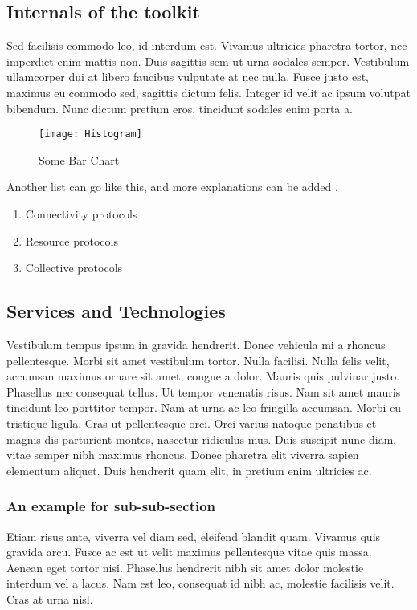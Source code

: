\documentclass[11pt, fullpage]{article}
\begin{document}
\subsection{Internals of the toolkit}

Sed facilisis commodo leo, id interdum est. Vivamus ultricies pharetra tortor, nec imperdiet enim mattis non. Duis sagittis sem ut urna sodales semper. Vestibulum ullamcorper dui at libero faucibus vulputate at nec nulla. Fusce justo est, maximus eu commodo sed, sagittis dictum felis. Integer id velit ac ipsum volutpat bibendum. Nunc dictum pretium eros, tincidunt sodales enim porta a.

\begin{figure}[ht]
\begin{center}
\texttt{[image: Histogram]}
\caption{Some Bar Chart}
\end{center}
\end{figure}

Another list can go like this, and more explanations can be added \cite{apples2}.
\begin{enumerate}
\item
Connectivity protocols 
\item
Resource protocols 
\item
Collective protocols 
\end{enumerate}
	
\subsection{Services and Technologies}
Vestibulum tempus ipsum in gravida hendrerit. Donec vehicula mi a rhoncus pellentesque. Morbi sit amet vestibulum tortor. Nulla facilisi. Nulla felis velit, accumsan maximus ornare sit amet, congue a dolor. Mauris quis pulvinar justo. Phasellus nec consequat tellus. Ut tempor venenatis risus. Nam sit amet mauris tincidunt leo porttitor tempor. Nam at urna ac leo fringilla accumsan. Morbi eu tristique ligula. Cras ut pellentesque orci. Orci varius natoque penatibus et magnis dis parturient montes, nascetur ridiculus mus. Duis suscipit nunc diam, vitae semper nibh maximus rhoncus. Donec pharetra elit viverra sapien elementum aliquet. Duis hendrerit quam elit, in pretium enim ultricies ac.

\subsubsection{An example for sub-sub-section}
Etiam risus ante, viverra vel diam sed, eleifend blandit quam. Vivamus quis gravida arcu. Fusce ac est ut velit maximus pellentesque vitae quis massa. Aenean eget tortor nisi. Phasellus hendrerit nibh sit amet dolor molestie interdum vel a lacus. Nam est leo, consequat id nibh ac, molestie facilisis velit. Cras at urna nisl.
\end{document}
